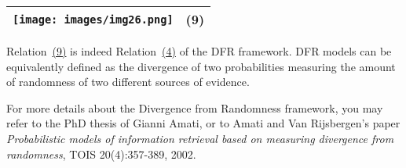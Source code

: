 \href{}{}

\begin{longtable}[]{@{}ll@{}}
\toprule
\texttt{[image: images/img26.png]} &
(9)\tabularnewline
\bottomrule
\end{longtable}

Relation~\protect\hyperlink{Eq:cross-entropy:DFR}{(9)} is indeed
Relation~\protect\hyperlink{Formula:DFR}{(4)} of the DFR framework. DFR
models can be equivalently defined as the divergence of two
probabilities measuring the amount of randomness of two different
sources of evidence.

For more details about the Divergence from Randomness framework, you may
refer to the PhD thesis of Gianni Amati, or to Amati and Van
Rijsbergen's paper \emph{Probabilistic models of information retrieval
based on measuring divergence from randomness}, TOIS 20(4):357-389,
2002.


